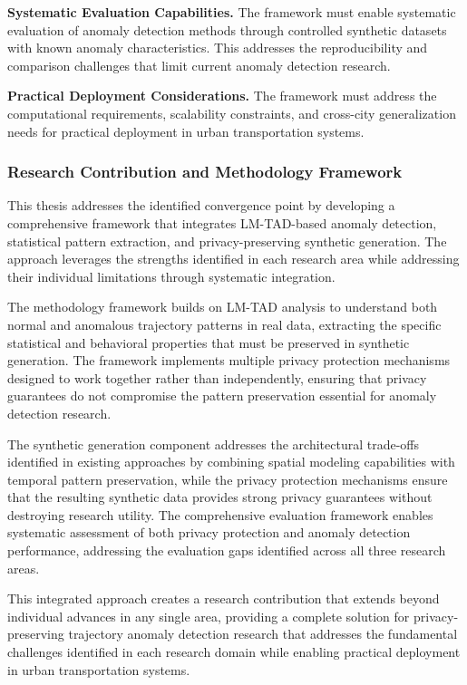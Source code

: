 \documentclass[runningheads]{llncs}
\begin{document}
\textbf{Systematic Evaluation Capabilities.} The framework must enable systematic evaluation of anomaly detection methods through controlled synthetic datasets with known anomaly characteristics. This addresses the reproducibility and comparison challenges that limit current anomaly detection research.

\textbf{Practical Deployment Considerations.} The framework must address the computational requirements, scalability constraints, and cross-city generalization needs for practical deployment in urban transportation systems.

\subsubsection{Research Contribution and Methodology Framework}

This thesis addresses the identified convergence point by developing a comprehensive framework that integrates LM-TAD-based anomaly detection, statistical pattern extraction, and privacy-preserving synthetic generation. The approach leverages the strengths identified in each research area while addressing their individual limitations through systematic integration.

The methodology framework builds on LM-TAD analysis to understand both normal and anomalous trajectory patterns in real data, extracting the specific statistical and behavioral properties that must be preserved in synthetic generation. The framework implements multiple privacy protection mechanisms designed to work together rather than independently, ensuring that privacy guarantees do not compromise the pattern preservation essential for anomaly detection research.

The synthetic generation component addresses the architectural trade-offs identified in existing approaches by combining spatial modeling capabilities with temporal pattern preservation, while the privacy protection mechanisms ensure that the resulting synthetic data provides strong privacy guarantees without destroying research utility. The comprehensive evaluation framework enables systematic assessment of both privacy protection and anomaly detection performance, addressing the evaluation gaps identified across all three research areas.

This integrated approach creates a research contribution that extends beyond individual advances in any single area, providing a complete solution for privacy-preserving trajectory anomaly detection research that addresses the fundamental challenges identified in each research domain while enabling practical deployment in urban transportation systems.
\end{document}
